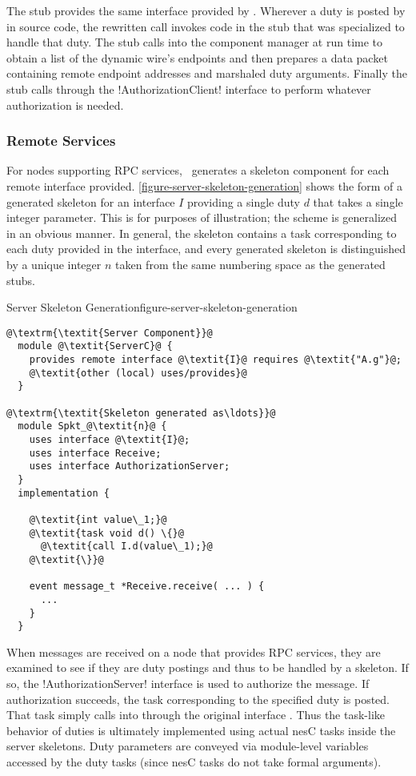 The  stub provides the same interface provided by
. Wherever a duty is posted by  in source code,
the rewritten call invokes code in the stub that was specialized to handle that duty. The stub
calls into the component manager at run time to obtain a list of the dynamic wire's endpoints
and then prepares a data packet containing remote endpoint addresses and marshaled duty
arguments. Finally the stub calls through the !AuthorizationClient! interface to perform
whatever authorization is needed.

\subsubsection{Remote Services}

For nodes supporting RPC services, \Sprocket\ generates a skeleton component for each remote
interface provided. \autoref{figure-server-skeleton-generation} shows the form of a generated
skeleton for an interface $I$ providing a single duty $d$ that takes a single integer parameter.
This is for purposes of illustration; the scheme is generalized in an obvious manner. In
general, the skeleton contains a task corresponding to each duty provided in the interface, and
every generated skeleton is distinguished by a unique integer $n$ taken from the same numbering
space as the generated stubs.

\begin{fpfig}[t]{Server Skeleton Generation}{figure-server-skeleton-generation}
{
\singlespace
\begin{lstlisting}[escapechar=@]
@\textrm{\textit{Server Component}}@
  module @\textit{ServerC}@ {
    provides remote interface @\textit{I}@ requires @\textit{"A.g"}@;
    @\textit{other (local) uses/provides}@
  }

@\textrm{\textit{Skeleton generated as\ldots}}@
  module Spkt_@\textit{n}@ {
    uses interface @\textit{I}@;
    uses interface Receive;
    uses interface AuthorizationServer;
  }
  implementation {

    @\textit{int value\_1;}@
    @\textit{task void d() \{}@
      @\textit{call I.d(value\_1);}@
    @\textit{\}}@

    event message_t *Receive.receive( ... ) {
      ...
    }
  }
\end{lstlisting}
\primaryspacing
}
\end{fpfig}

When messages are received on a node that provides RPC services, they are examined to see if
they are duty postings and thus to be handled by a skeleton. If so, the !AuthorizationServer!
interface is used to authorize the message. If authorization succeeds, the task corresponding to
the specified duty is posted. That task simply calls into  through the
original interface . Thus the task-like behavior of duties is ultimately
implemented using actual nesC tasks inside the server skeletons. Duty parameters are conveyed
via module-level variables accessed by the duty tasks (since nesC tasks do not take formal
arguments).

